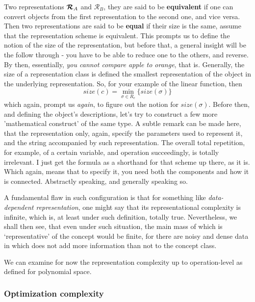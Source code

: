\documentclass[10pt]{article}
\begin{document}
Two representations $\bm{\mathcal{R}}_{A}$ and $\mathcal{R}_{B}$, they are said to be \textbf{equivalent} if one can convert objects from the first representation to the second one, and vice versa. Then two representations are said to be \textbf{equal} if their size is the same, assume that the representation scheme is equivalent. This prompts us to define the notion of the size of the representation, but before that, a general insight will be the follow through - you have to be able to reduce one to the others, and reverse. By then, essentially, \textit{you cannot compare apple to orange}, that is. Generally, the size of a representation class is defined the smallest representation of the object in the underlying representation. So, for your example of the linear function, then 
\begin{equation}
    size(c)=\min_{\sigma \in R_{c}}\{size(\sigma)\}
\end{equation}
which again, prompt us \textit{again}, to figure out the notion for $size(\sigma)$. Before then, and defining the object's descriptions, let's try to construct a few more 'mathematical construct' of the same type. A subtle remark can be made here, that the representation only, again, specify the parameters used to represent it, and the string accompanied by such representation. The overall total repetition, for example, of a certain variable, and operation succeedingly, is totally irrelevant. I just get the formula as a shorthand for that scheme up there, as it is. Which again, means that to specify it, you need both the components and how it is connected. Abstractly speaking, and generally speaking so. 

A fundamental flaw in such configuration is that for something like \textit{data-dependent representation}, one might say that its representational complexity is infinite, which is, at least under such definition, totally true. Nevertheless, we shall then see, that even under such situation, the main mass of which is `representative' of the concept would be finite, for there are noisy and dense data in which does not add more information than not to the concept class. 

We can examine for now the representation complexity up to operation-level as defined for polynomial space. 

\subsubsection{Optimization complexity}
\end{document}
